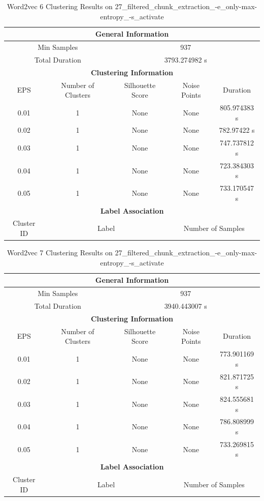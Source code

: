 \begin{longtable}{|c|c|c|c|c|}
\caption{Word2vec 6 Clustering Results on 27\_filtered\_chunk\_extraction\_-e\_only-max-entropy\_-s\_activate} \label{tab:27_filtered_chunk_extraction_-e_only-max-entropy_-s_activate_word2vec_6_clustering_results}\\
\hline
\multicolumn{5}{|c|}{\textbf{General Information}} \\
\hline
\multicolumn{2}{|c|}{Min Samples} & \multicolumn{3}{c|}{937} \\
\multicolumn{2}{|c|}{Total Duration} & \multicolumn{3}{c|}{3793.274982 s} \\
\hline
\multicolumn{5}{|c|}{\textbf{Clustering Information}} \\
\hline
EPS & Number of Clusters & Silhouette Score & Noise Points & Duration \\
0.01 & 1 & None & None & 805.974383 s\\
0.02 & 1 & None & None & 782.97422 s\\
0.03 & 1 & None & None & 747.737812 s\\
0.04 & 1 & None & None & 723.384303 s\\
0.05 & 1 & None & None & 733.170547 s\\
\hline
\multicolumn{5}{|c|}{\textbf{Label Association}} \\
\hline
Cluster ID & \multicolumn{2}{c|}{Label} & \multicolumn{2}{c|}{Number of Samples} \\
\hline
\end{longtable}


\begin{longtable}{|c|c|c|c|c|}
\caption{Word2vec 7 Clustering Results on 27\_filtered\_chunk\_extraction\_-e\_only-max-entropy\_-s\_activate} \label{tab:27_filtered_chunk_extraction_-e_only-max-entropy_-s_activate_word2vec_7_clustering_results}\\
\hline
\multicolumn{5}{|c|}{\textbf{General Information}} \\
\hline
\multicolumn{2}{|c|}{Min Samples} & \multicolumn{3}{c|}{937} \\
\multicolumn{2}{|c|}{Total Duration} & \multicolumn{3}{c|}{3940.443007 s} \\
\hline
\multicolumn{5}{|c|}{\textbf{Clustering Information}} \\
\hline
EPS & Number of Clusters & Silhouette Score & Noise Points & Duration \\
0.01 & 1 & None & None & 773.901169 s\\
0.02 & 1 & None & None & 821.871725 s\\
0.03 & 1 & None & None & 824.555681 s\\
0.04 & 1 & None & None & 786.808999 s\\
0.05 & 1 & None & None & 733.269815 s\\
\hline
\multicolumn{5}{|c|}{\textbf{Label Association}} \\
\hline
Cluster ID & \multicolumn{2}{c|}{Label} & \multicolumn{2}{c|}{Number of Samples} \\
\hline
\end{longtable}


